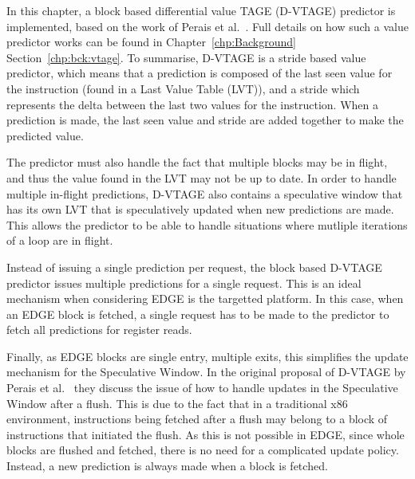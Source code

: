 In this chapter, a block based differential value TAGE (D-VTAGE) predictor is implemented, based on the work of Perais et al.~\cite{peraisBeBop2015}.
Full details on how such a value predictor works can be found in Chapter~\ref{chp:Background} Section~\ref{chp:bck:vtage}.
To summarise, D-VTAGE is a stride based value predictor, which means that a prediction is composed of the last seen value for the instruction (found in a Last Value Table (LVT)), and a stride which represents the delta between the last two values for the instruction.
When a prediction is made, the last seen value and stride are added together to make the predicted value.

The predictor must also handle the fact that multiple blocks may be in flight, and thus the value found in the LVT may not be up to date.
In order to handle multiple in-flight predictions, D-VTAGE also contains a speculative window that has its own LVT that is speculatively updated when new predictions are made.
This allows the predictor to be able to handle situations where mutliple iterations of a loop are in flight.

Instead of issuing a single prediction per request, the block based D-VTAGE predictor issues multiple predictions for a single request.
This is an ideal mechanism when considering EDGE is the targetted platform.
In this case, when an EDGE block is fetched, a single request has to be made to the predictor to fetch all predictions for register reads.

Finally, as EDGE blocks are single entry, multiple exits, this simplifies the update mechanism for the Speculative Window.
In the original proposal of D-VTAGE by Perais et al.~\cite{peraisBeBop2015} they discuss the issue of how to handle updates in the Speculative Window after a flush.
This is due to the fact that in a traditional x86 environment, instructions being fetched after a flush may belong to a block of instructions that initiated the flush.
As this is not possible in EDGE, since whole blocks are flushed and fetched, there is no need for a complicated update policy.
Instead, a new prediction is always made when a block is fetched.





